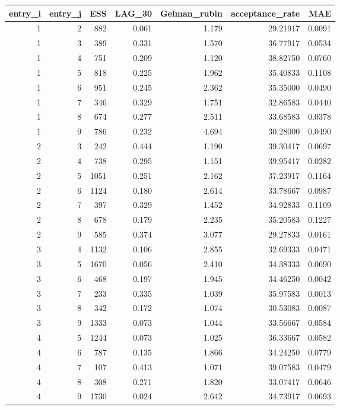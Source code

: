 \begin{longtable}{rrrrrrr}
\toprule
entry\_i & entry\_j & ESS & LAG\_30 & Gelman\_rubin & acceptance\_rate & MAE \\ 
\midrule
1 & 2 & 882 & 0.061 & 1.179 & 29.21917 & 0.0091 \\ 
1 & 3 & 389 & 0.331 & 1.570 & 36.77917 & 0.0534 \\ 
1 & 4 & 751 & 0.209 & 1.120 & 38.82750 & 0.0760 \\ 
1 & 5 & 818 & 0.225 & 1.962 & 35.40833 & 0.1108 \\ 
1 & 6 & 951 & 0.245 & 2.362 & 35.35000 & 0.0490 \\ 
1 & 7 & 346 & 0.329 & 1.751 & 32.86583 & 0.0440 \\ 
1 & 8 & 674 & 0.277 & 2.511 & 33.68583 & 0.0378 \\ 
1 & 9 & 786 & 0.232 & 4.694 & 30.28000 & 0.0490 \\ 
2 & 3 & 242 & 0.444 & 1.190 & 39.30417 & 0.0697 \\ 
2 & 4 & 738 & 0.295 & 1.151 & 39.95417 & 0.0282 \\ 
2 & 5 & 1051 & 0.251 & 2.162 & 37.23917 & 0.1164 \\ 
2 & 6 & 1124 & 0.180 & 2.614 & 33.78667 & 0.0987 \\ 
2 & 7 & 397 & 0.329 & 1.452 & 34.92833 & 0.1109 \\ 
2 & 8 & 678 & 0.179 & 2.235 & 35.20583 & 0.1227 \\ 
2 & 9 & 585 & 0.374 & 3.077 & 29.27833 & 0.0161 \\ 
3 & 4 & 1132 & 0.106 & 2.855 & 32.69333 & 0.0471 \\ 
3 & 5 & 1670 & 0.056 & 2.410 & 34.38333 & 0.0690 \\ 
3 & 6 & 468 & 0.197 & 1.945 & 34.46250 & 0.0042 \\ 
3 & 7 & 233 & 0.335 & 1.039 & 35.97583 & 0.0013 \\ 
3 & 8 & 342 & 0.172 & 1.074 & 30.53083 & 0.0087 \\ 
3 & 9 & 1333 & 0.073 & 1.044 & 33.56667 & 0.0584 \\ 
4 & 5 & 1244 & 0.073 & 1.025 & 36.33667 & 0.0582 \\ 
4 & 6 & 787 & 0.135 & 1.866 & 34.24250 & 0.0779 \\ 
4 & 7 & 107 & 0.413 & 1.071 & 39.07583 & 0.0479 \\ 
4 & 8 & 308 & 0.271 & 1.820 & 33.07417 & 0.0646 \\ 
4 & 9 & 1730 & 0.024 & 2.642 & 34.73917 & 0.0693 \\ 

\end{longtable}
